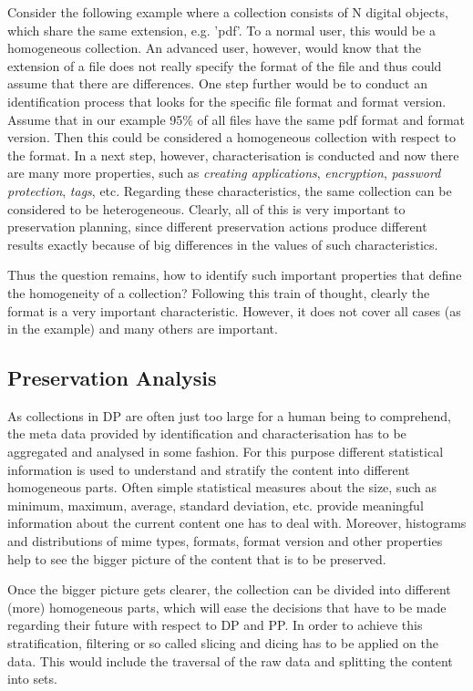 Consider the following example where a collection consists of N digital objects, which share the same extension, e.g. 'pdf'. To a normal user, this would be a homogeneous collection. An advanced user, however, would know that the extension of a file does not really specify the format of the file and thus could assume that there are differences.
One step further would be to conduct an identification process that looks for the specific file format and format version. Assume that in our example 95\% of all files have the same pdf format and format version.  Then this could be considered a homogeneous collection with respect to the format.  In a next step, however, characterisation is conducted and now there are many more properties, such as \textit{creating applications}, \textit{encryption}, \textit{password protection}, \textit{tags}, etc.
Regarding these characteristics, the same collection can be considered to be heterogeneous.
Clearly, all of this is very important to preservation planning, since different preservation actions produce different results exactly because of big differences in the values of such characteristics.

Thus the question remains, how to identify such important properties that define the homogeneity of a collection? Following this train of thought, clearly the format is a very important characteristic. However, it does not cover all cases (as in the example) and many others are important.

\subsection{Preservation Analysis}
As collections in DP are often just too large for a human being to comprehend, the meta data provided by identification and characterisation has to be aggregated and analysed in some fashion. For this purpose different statistical information is used to understand and stratify the content into different homogeneous parts. Often simple statistical measures about the size, such as minimum, maximum, average, standard deviation, etc. provide meaningful information about the current content one has to deal with. Moreover, histograms and distributions of mime types, formats, format version and other properties help to see the bigger picture of the content that is to be preserved.

Once the bigger picture gets clearer, the collection can be divided into different (more) homogeneous parts, which will ease the decisions that have to be made regarding their future with respect to DP and PP. In order to achieve this stratification, filtering or so called slicing and dicing has to be applied on the data. This would include the traversal of the raw data and splitting the content into sets.

